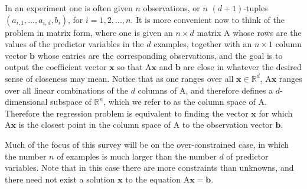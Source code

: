 \documentclass[11pt]{article}
\newcommand{\mat}[1]{{\ensuremath{\bm{\mathrm{#1}}}}}
\def\b{{\mathbf b}}
\def\matA{\mat{A}}
\def\x{{\mathbf x}}
\def\b{{\mathbf b}}
\begin{document}
In an experiment one is often given $n$ observations, or $n$
$(d+1)$-tuples $(a_{i,1}, \ldots, a_{i,d}, b_i)$, for $i = 1, 2, \ldots, n$. It
is more convenient now to think of the problem in matrix form, where
one is given an $n \times d$ matrix $\matA$ whose rows are the values of the
predictor variables in the $d$ examples, together with an $n \times 1$
column vector $\b$ whose entries are the corresponding observations, and
the goal is to output the coefficient vector $\x$ so that $\matA \x$ and $\b$
are close in whatever the desired sense of closeness may mean. Notice
that as one ranges over all $\x \in \mathbb{R}^d$, $\matA \x$ ranges over
all linear combinations of the $d$ columns of $\matA$, and therefore defines
a $d$-dimensional subspace of $\mathbb{R}^n$, which we refer to as the column
space of $\matA$. Therefore the regression
problem is equivalent to finding the vector $\x$ for which $\matA \x$ is the closest
point in the column space of $\matA$ to the observation vector $\b$. 

Much of the focus of this survey will be on the over-constrained case, in which
the number $n$ of examples is much larger than the number $d$ of predictor
variables. Note that in this case there are more constraints than unknowns,
and there need not exist a solution $\x$ to the equation $\matA \x = \b$. 
\end{document}
